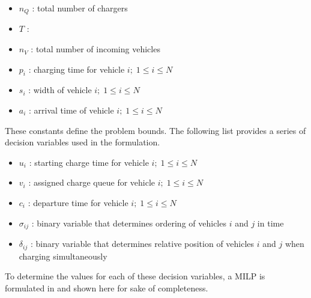 \documentclass[utf8]{FrontiersinHarvard}
\let\cite\citep                                                                 %
\begin{document}
\begin{itemize}
	\item $n_Q$ : total number of chargers
	\item $T$   : 
	\item $n_V$ : total number of incoming vehicles
	\item $p_i$ : charging time for vehicle $i;\; 1 \leq i \leq N$
	\item $s_i$ : width of vehicle $i;\; 1 \leq i \leq N$
	\item $a_i$ : arrival time of vehicle $i;\; 1 \leq i \leq N$
\end{itemize}

These constants define the problem bounds. The following list provides a series of decision variables used in the
formulation.

\begin{itemize}
    \item $u_i$    : starting charge time for vehicle $i;\; 1 \leq i \leq N$
    \item $v_i$    : assigned charge queue for vehicle $i;\; 1 \leq i \leq N$
    \item $c_i$    : departure time for vehicle $i;\; 1 \leq i \leq N$
    \item $\sigma_{ij}$ : binary variable that determines ordering of vehicles $i$ and $j$ in time
    \item $\delta_{ij}$ : binary variable that determines relative position of vehicles $i$ and $j$ when charging simultaneously
\end{itemize}

To determine the values for each of these decision variables, a MILP is formulated in \cite{Qarebagh2019} and shown
here for sake of completeness.
\end{document}
